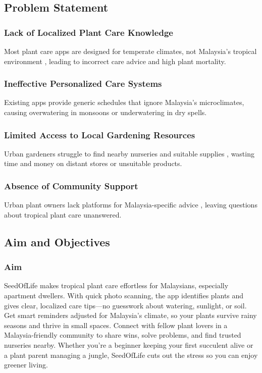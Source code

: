 \documentclass[conference]{IEEEtran}
\begin{document}
\subsection{Problem Statement}
\label{subsec:problem-statement-urban}

\subsubsection{Lack of Localized Plant Care Knowledge}
\label{sssec:localized-knowledge-urban}
Most plant care apps are designed for temperate climates, not Malaysia's tropical environment \cite{lim2023}, leading to incorrect care advice and high plant mortality.

\subsubsection{Ineffective Personalized Care Systems}
\label{sssec:ineffective-care-urban}
Existing apps provide generic schedules that ignore Malaysia's microclimates, causing overwatering in monsoons or underwatering in dry spells.

\subsubsection{Limited Access to Local Gardening Resources}
\label{sssec:limited-resources-urban}
Urban gardeners struggle to find nearby nurseries and suitable supplies \cite{moa2023}, wasting time and money on distant stores or unsuitable products.

\subsubsection{Absence of Community Support}
\label{sssec:community-support-urban}
Urban plant owners lack platforms for Malaysia-specific advice \cite{ugam2024}, leaving questions about tropical plant care unanswered.

\subsection{Aim and Objectives}
\label{subsec:aim-objectives}

\subsubsection{Aim}
\label{sssec:aim}
SeedOfLife makes tropical plant care effortless for Malaysians, especially apartment dwellers. With quick photo scanning, the app identifies plants and gives clear, localized care tips—no guesswork about watering, sunlight, or soil. Get smart reminders adjusted for Malaysia's climate, so your plants survive rainy seasons and thrive in small spaces.
Connect with fellow plant lovers in a Malaysia-friendly community to share wins, solve problems, and find trusted nurseries nearby. Whether you're a beginner keeping your first succulent alive or a plant parent managing a jungle, SeedOfLife cuts out the stress so you can enjoy greener living.
\end{document}
